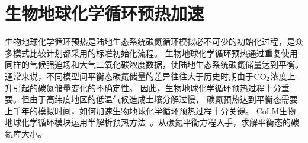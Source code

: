 \chapter{生物地球化学循环预热加速}\label{生物地球化学循环预热加速}

生物地球化学循环预热是陆地生态系统碳氮循环模拟必不可少的初始化过程，是众多模式比较计划都采用的标准初始化流程。
生物地球化学循环预热通过重复使用同样的气候强迫场和大气二氧化碳浓度数据，使陆地生态系统碳氮储量达到平衡。
通常来说，不同模型间平衡态碳氮储量的差异往往大于历史时期由于$\rm CO_2$浓度上升引起的碳氮储量变化的不确定性。
因此，生物地球化学循环预热过程十分重要。但由于高纬度地区的低温气候造成土壤分解过慢，
碳氮预热达到平衡态需要上千年的模拟时间，如何加速生物地球化学循环预热过程十分关键。
CoLM生物地球化学循环模块运用半解析预热方法~\citep{xia2012semi}。从碳氮平衡方程入手，求解平衡态的碳氮库大小。



